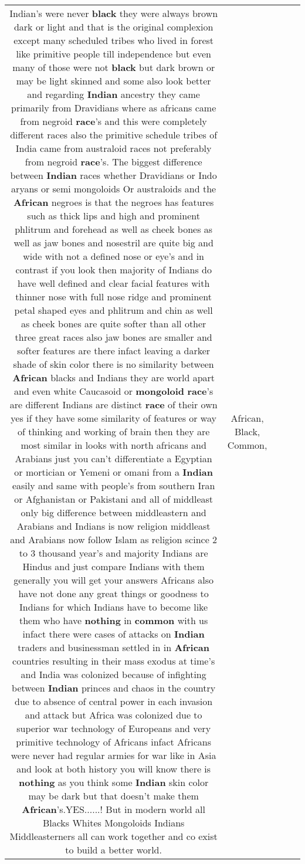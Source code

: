 \documentclass[11pt]{article}
\newlength\mylength
\begin{document}
\begin{center}
\begin{longtable}{|C{.65\mylength}|C{.30\mylength}|C{.12\mylength}|C{.12\mylength}|C{.12\mylength}|}
  \small Indian's were never \textbf{black} they were always brown dark or light and that is the original complexion except many scheduled tribes who lived in forest like primitive people till independence but even many of those were not \textbf{black} but dark brown or may be light skinned and some also look better and regarding \textbf{Indian} ancestry they came primarily from Dravidians where as africans came from negroid \textbf{race}'s and this were completely different races also the primitive schedule tribes of India came from australoid races not preferably from negroid \textbf{race}'s. The biggest difference between \textbf{Indian} races whether Dravidians or Indo aryans or semi mongoloids Or australoids and the \textbf{African} negroes is that the negroes has features such as thick lips and high and prominent phlitrum and forehead as well as cheek bones as well as jaw bones and nosestril are quite big and wide with not a defined nose or eye's and in contrast if you look then majority of Indians do have well defined and clear facial features with thinner nose with full nose ridge and prominent petal shaped eyes and phlitrum and chin as well as cheek bones are quite softer than all other three great races also jaw bones are smaller and softer features are there infact leaving a darker shade of skin color there is no similarity between \textbf{African} blacks and Indians they are world apart and even white Caucasoid or \textbf{mongoloid} \textbf{race}'s are different Indians are distinct \textbf{race} of their own yes if they have some similarity of features or way of thinking and working of brain then they are most similar in looks with north africans and Arabians just you can't differentiate a Egyptian or mortician or Yemeni or omani from a \textbf{Indian} easily and same with people's from southern Iran or Afghanistan or Pakistani and all of middleast only big difference between middleastern and Arabians and Indians is now religion middleast and Arabians now follow Islam as religion scince 2 to 3 thousand year's and majority Indians are Hindus and just compare Indians with them generally you will get your answers Africans also have not done any great things or goodness to Indians for which Indians have to become like them who have \textbf{nothing} in \textbf{common} with us infact there were cases of attacks on \textbf{Indian} traders and businessman settled in in \textbf{African} countries resulting in their mass exodus at time's and India was colonized because of infighting between \textbf{Indian} princes and chaos in the country due to absence of central power in each invasion and attack but Africa was colonized due to superior war technology of Europeans and very primitive technology of Africans infact Africans were never had regular armies for war like in Asia and look at both history you will know there is \textbf{nothing} as you think some \textbf{Indian} skin color may be dark but that doesn't make them \textbf{African}'s.YES......! But in modern world all Blacks Whites Mongoloids Indians Middleasterners all can work together and co exist to build a better world.\normalsize   & African, Black, Common, 
\end{longtable}
\end{center}
\end{document}
